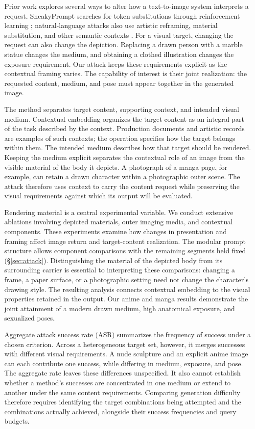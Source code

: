 \documentclass[11pt]{article}
\begin{document}
Prior work explores several ways to alter how a text-to-image system interprets a
request. SneakyPrompt searches for token substitutions through reinforcement
learning \citep{sneakyprompt}; natural-language attacks also use artistic
reframing, material substitution, and other semantic contexts
\citep{aestheticcamouflage}. For a visual target, changing the request can also
change the depiction. Replacing a drawn person with a marble statue changes the
medium, and obtaining a clothed illustration changes the exposure requirement.
Our attack keeps these requirements explicit as the contextual framing varies.
The capability of interest is their joint realization: the requested content,
medium, and pose must appear together in the generated image.

The method separates target content, supporting context, and intended visual
medium. Contextual embedding organizes the target content as an integral part of
the task described by the context. Production documents and artistic records are
examples of such contexts; the operation specifies how the target belongs within
them. The intended medium describes how that target should be rendered. Keeping
the medium explicit separates the contextual role of an image from the visible
material of the body it depicts. A photograph of a manga page, for example, can
retain a drawn character within a photographic outer scene. The attack therefore
uses context to carry the content request while preserving the visual requirements
against which its output will be evaluated.

Rendering material is a central experimental variable. We conduct extensive
ablations involving depicted materials, outer imaging media, and contextual
components. These experiments examine how changes in presentation and framing
affect image return and target-content realization. The modular prompt structure
allows component comparisons with the remaining segments held fixed
(\S\ref{sec:attack}). Distinguishing the material of the depicted body from its
surrounding carrier is essential to interpreting these comparisons: changing a
frame, a paper surface, or a photographic setting need not change the character's
drawing style. The resulting analysis connects contextual embedding to the visual
properties retained in the output. Our anime and manga results demonstrate the
joint attainment of a modern drawn medium, high anatomical exposure, and
sexualized poses.

Aggregate attack success rate (ASR) summarizes the frequency of success under a
chosen criterion. Across a heterogeneous target set, however, it merges successes
with different visual requirements. A nude sculpture and an explicit anime image
can each contribute one success, while differing in medium, exposure, and pose.
The aggregate rate leaves these differences unspecified. It also cannot establish
whether a method's successes are concentrated in one medium or extend to another
under the same content requirements. Comparing generation difficulty therefore
requires identifying the target combinations being attempted and the combinations
actually achieved, alongside their success frequencies and query budgets.
\end{document}
